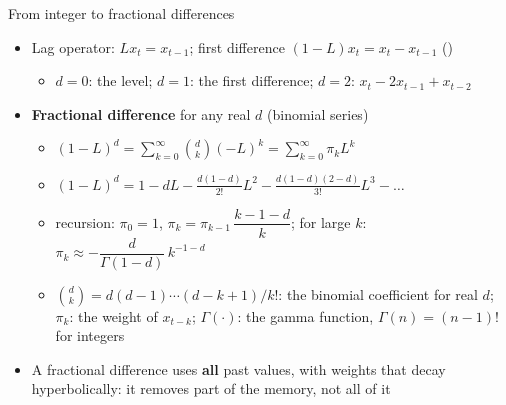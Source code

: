 \begin{frame}{From integer to fractional differences}
\itemsize{\small}
\begin{itemize}
    \item Lag operator: $Lx_t = x_{t-1}$; first difference $(1-L)x_t = x_t - x_{t-1}$ ()
    \begin{itemize}
        \item $d = 0$: the level; $d = 1$: the first difference; $d = 2$: $x_t - 2x_{t-1} + x_{t-2}$
    \end{itemize}
    \item \textbf{Fractional difference} for any real $d$ (binomial series)
    \begin{itemize}
        \item $(1-L)^d = \sum_{k=0}^{\infty}\binom{d}{k}(-L)^k = \sum_{k=0}^{\infty}\pi_k L^k$
        \item $(1-L)^d = 1 - dL - \frac{d(1-d)}{2!}L^2 - \frac{d(1-d)(2-d)}{3!}L^3 - \dots$
        \item recursion: $\pi_0 = 1$, $\pi_k = \pi_{k-1}\,\dfrac{k - 1 - d}{k}$; for large $k$: $\pi_k \approx -\dfrac{d}{\Gamma(1-d)}\,k^{-1-d}$
        \item $\binom{d}{k} = d(d-1)\cdots(d-k+1)/k!$: the binomial coefficient for real $d$; $\pi_k$: the weight of $x_{t-k}$; $\Gamma(\cdot)$: the gamma function, $\Gamma(n) = (n-1)!$ for integers
    \end{itemize}
    \item A fractional difference uses \textbf{all} past values, with weights that decay hyperbolically: it removes part of the memory, not all of it
\end{itemize}
\end{frame}

